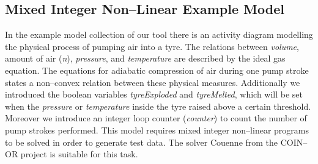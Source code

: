 \documentclass[runningheads,a4paper]{llncs}%
\newcommand{\OCLVar}[1]{\textit{#1}}
\begin{document}
\subsection{Mixed Integer Non--Linear Example Model}
\label{sec:exampleModelNonConvex}
In the example model collection of our tool there is an activity diagram modelling the physical process of pumping air into a tyre. The relations between \OCLVar{volume}, amount of air (\OCLVar{n}), \OCLVar{pressure}, and \OCLVar{temperature} are described by the ideal gas equation. The equations for adiabatic compression of air during one pump stroke states a non--convex relation between these physical measures. Additionally we introduced the boolean variables \OCLVar{tyreExploded} and \OCLVar{tyreMelted}, which will be set when the \OCLVar{pressure} or \OCLVar{temperature} inside the tyre raised above a certain threshold. Moreover we introduce an integer loop counter (\OCLVar{counter}) to count the number of pump strokes performed. This model requires mixed integer non--linear programs to be solved in order to generate test data. The solver Couenne \cite{Belotti09couenne} from the COIN--OR project is suitable for this task.%
\end{document}
